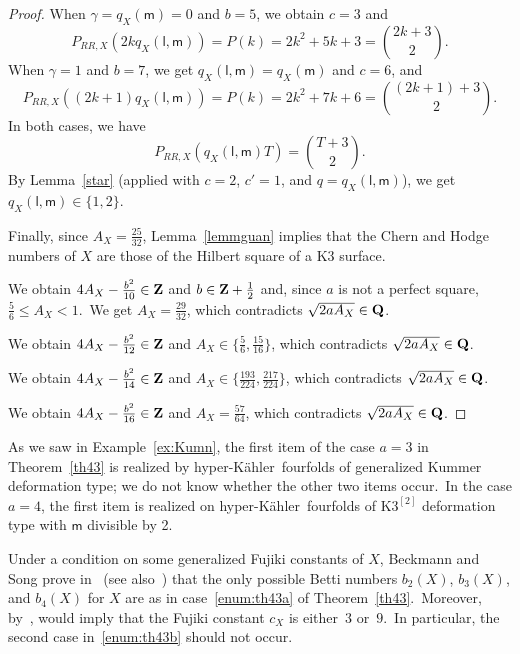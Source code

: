 \documentclass[12pt]{amsart}
\def\Z{{\bf Z}}
\def\Q{{\bf Q}}
\def\hk{hyper-K\"ahler}
\theoremstyle{remark}
\def\lll{\ensuremath{\mathsf l}}
\def\mm{\ensuremath{\mathsf m}}
\begin{document}
\begin{proof}
When $\gamma=q_X( \mm)=0$ and $b=5$, we
obtain $c=3$ and
\[
P_{RR,X}(2kq_X(\lll,\mm))=P(k)= 2k^2 + 5  k +3=\binom{2k+3}{2}.
\]
When
$\gamma=1$ and $b=7$, we   get $q_X(\lll,\mm)=q_X(\mm)$ and $c=6$, and
\[
P_{RR,X}((2k+1)q_X(\lll,\mm))=P(k)= 2k^2 +7  k +6=\binom{(2k+1)+3}{2}.
\]
 In both cases, we have
 $$
 P_{RR,X}(q_X(\lll,\mm)T)=\binom{T+3}{2}.
 $$
 By Lemma~\ref{star} (applied with $c=2$, $c'=1$, and $q=q_X(\lll,\mm)$),
we get $q_X(\lll,\mm)\in\{1,2\}$.

Finally, since $A_X=\frac{25}{32}$, Lemma~\ref{lemmguan} implies that  the Chern and Hodge numbers of $X$ are those of the Hilbert square of a K3 surface.

\medskip
{} We   obtain $4A_X-\frac{b^2}{10}\in\Z$ and $b\in  \Z +\frac12$ and, since $a$ is not a perfect square, $\frac{5}{6}\le A_X<1 $.\
We get $A_X=\frac{29}{32} $, which contradicts  $\sqrt{2aA_X}\in\Q$.

\medskip
{} We   obtain $4A_X-\frac{b^2}{12}\in\Z$ and $A_X\in\{\frac56,\frac{15}{16}\}$, which contradicts  $\sqrt{2aA_X}\in\Q$.

\medskip
{} We   obtain $4A_X-\frac{b^2}{14}\in\Z$ and $A_X\in\{\frac{193}{224},\frac{217}{224}\}$, which contradicts  $\sqrt{2aA_X}\in\Q$.

\medskip
{} We   obtain $4A_X-\frac{b^2}{16}\in\Z$ and $A_X=\frac{57}{64}$, which contradicts  $\sqrt{2aA_X}\in\Q$.
\end{proof}

As we saw in Example~\ref{ex:Kumn},  the first item of the case $a=3$ in Theorem~\ref{th43} is realized by \hk\ fourfolds  of generalized Kummer deformation type;  we do not know whether the other two items occur.\
In the case $a=4$, the first item is realized  on \hk\ fourfolds of $\mathrm{K3}^{[2]}$ deformation type with $\mm$ divisible by 2.

Under a condition on some generalized Fujiki constants of $X$, Beckmann and Song prove in~\cite{bs} (see also~\cite{saw2}) that the only possible Betti numbers $b_2(X)$, $b_3(X)$, and $b_4(X)$ for $X$ are as in case~\ref{enum:th43a} of Theorem~\ref{th43}.\ 
Moreover, by~\cite[Proposition 5.6]{bs}, \cite[Conjecture 1.2]{bs} would imply that the Fujiki constant $c_X$ is either~$3$ or~$9$.\ In particular, the second case in~\ref{enum:th43b} should not occur.



\end{document}
